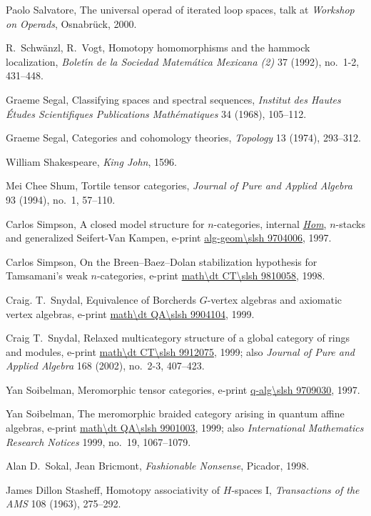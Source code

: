 \begin{thebibliography}{c9999}
Paolo Salvatore, 
The universal operad of iterated loop spaces,
talk at \emph{Workshop on Operads},
Osnabr\"uck, 2000.

R.~Schw\"anzl, R.~Vogt, 
Homotopy homomorphisms and the hammock localization,
\emph{Bolet\'\i n de la Sociedad Matem\'atica Mexicana (2)} 37 (1992), 
no.~1-2, 431--448.

Graeme Segal, 
Classifying spaces and spectral sequences, 
\emph{Institut des Hautes \'Etudes Scientifiques Publications Math\'ematiques}
34 (1968), 105--112.

Graeme Segal, 
Categories and cohomology theories,
\emph{Topology} 13 (1974), 293--312.

William Shakespeare, 
\emph{King John},
1596.

Mei Chee Shum, 
Tortile tensor categories,
\emph{Journal of Pure and Applied Algebra} 93 (1994), no.~1, 57--110.

Carlos Simpson,
A closed model structure for $n$-categories, internal
\textit{\underline{Hom}}, $n$-stacks and generalized Seifert-Van Kampen,  
e-print \url{alg-geom\slsh 9704006}, 1997.

Carlos Simpson,
On the Breen--Baez--Dolan stabilization hypothesis for Tamsamani's weak
$n$-categories,  
e-print \url{math\dt CT\slsh 9810058}, 1998.

Craig. T.~Snydal, 
Equivalence of Borcherds $G$-vertex algebras and axiomatic vertex algebras, 
e-print \url{math\dt QA\slsh 9904104}, 1999.

Craig T.~Snydal, 
Relaxed multicategory structure of a global category of rings and modules,
e-print \url{math\dt CT\slsh 9912075}, 1999;
also 
\emph{Journal of Pure and Applied Algebra} 168 (2002), no.~2-3, 407--423.

Yan Soibelman,
Meromorphic tensor categories,
e-print \url{q-alg\slsh 9709030}, 1997.

Yan Soibelman, 
The meromorphic braided category arising in quantum affine
algebras,
e-print \url{math\dt QA\slsh 9901003}, 1999;
also
\emph{International Mathematics Research Notices} 1999, no.~19, 1067--1079.

Alan D.~Sokal, Jean Bricmont, 
\emph{Fashionable Nonsense},
Picador, 1998.

James Dillon Stasheff,
Homotopy associativity of $H$-spaces I,
\emph{Transactions of the AMS} 108 (1963), 275--292.


\end{thebibliography}
